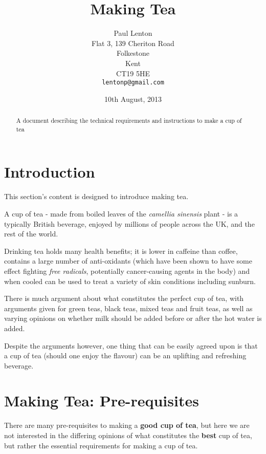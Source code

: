 \documentclass{article}
\begin{document}
\title{Making Tea}
\author{Paul Lenton\\
 Flat 3, 139 Cheriton Road\\
 Folkestone\\
 Kent\\
 CT19 5HE\\
 \texttt{lentonp@gmail.com}}
\date{10th August, 2013}
\maketitle


\begin{abstract}
A document describing the technical requirements and instructions to make a cup of tea
\end{abstract}

\section{Introduction}

This section's content is designed to introduce making tea.

\bigskip\noindent
A cup of tea - made from boiled leaves of the {\it camellia sinensis} plant - is a typically
British beverage, enjoyed by millions of people across the UK, and the rest of the world.

\bigskip\noindent
Drinking tea holds many health benefits; it is lower in caffeine than coffee, contains a large
number of anti-oxidants (which have been shown to have some effect fighting {\it free radicals},
potentially cancer-causing agents in the body) and when cooled can be used to treat a variety of
skin conditions including sunburn.

\bigskip\noindent
There is much argument about what constitutes the perfect cup of tea, with arguments given for
green teas, black teas, mixed teas and fruit teas, as well as varying opinions on whether milk should
be added before or after the hot water is added.

Despite the arguments however, one thing that can be easily agreed upon is that a cup of tea (should
one enjoy the flavour) can be an uplifting and refreshing beverage.

\section{Making Tea: Pre-requisites}

There are many pre-requisites to making a {\bf good cup of tea}, but here we are not interested in the
differing opinions of what constitutes the {\bf best} cup of tea, but rather the essential requirements
for making a cup of tea. 
\end{document}
